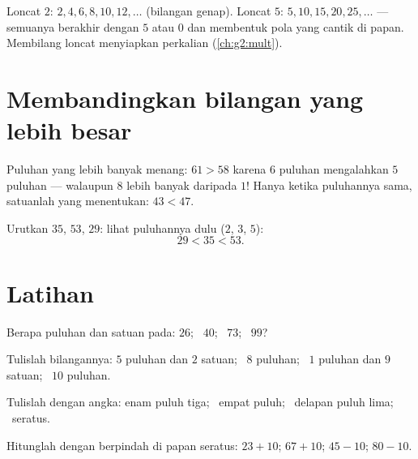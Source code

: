 \begin{example}\label{ex:g1:tens:skip}
Loncat $2$: $2, 4, 6, 8, 10, 12, \dots$ (bilangan genap). Loncat
$5$: $5, 10, 15, 20, 25, \dots$ --- semuanya berakhir dengan $5$ atau $0$
dan membentuk pola yang cantik di papan. Membilang loncat menyiapkan
perkalian (\cref{ch:g2:mult}).
\end{example}

\section{Membandingkan bilangan yang lebih besar}

\begin{method}\label{met:g1:tens:compare}
Puluhan yang lebih banyak menang: $61 > 58$ karena $6$ puluhan
mengalahkan $5$ puluhan --- walaupun $8$ lebih banyak daripada $1$!
Hanya ketika puluhannya sama, satuanlah yang menentukan: $43 < 47$.
\end{method}

\begin{example}\label{ex:g1:tens:compare}
Urutkan $35$, $53$, $29$: lihat puluhannya dulu ($2$, $3$, $5$):
\[
29 < 35 < 53 .
\]
\end{example}

\section{Latihan}

\begin{exercise}[$\star$]\label{exo:g1:tens:1}
Berapa puluhan dan satuan pada: $26$; \ $40$; \ $73$; \ $99$?
\end{exercise}

\begin{exercise}[$\star$]\label{exo:g1:tens:2}
Tulislah bilangannya: $5$ puluhan dan $2$ satuan; \ $8$ puluhan; \
$1$ puluhan dan $9$ satuan; \ $10$ puluhan.
\end{exercise}

\begin{exercise}[$\star$]\label{exo:g1:tens:3}
Tulislah dengan angka: enam puluh tiga; \ empat puluh; \ delapan
puluh lima; \ seratus.
\end{exercise}

\begin{exercise}[$\star$]\label{exo:g1:tens:4}
Hitunglah dengan berpindah di papan seratus: $23 + 10$; \quad
$67 + 10$; \quad $45 - 10$; \quad $80 - 10$.
\end{exercise}

